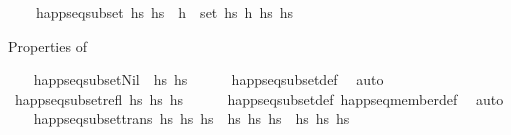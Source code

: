 \begin{isabellebody}
\ \ \ \ {\isachardoublequoteopen}happ{\isacharunderscore}{\kern0pt}seq{\isacharunderscore}{\kern0pt}subset\ hs\ hs\ {\isasymlongleftrightarrow}\ {\isacharparenleft}{\kern0pt}{\isasymforall}h\ {\isasymin}\ set\ hs\ h\ {\isasymin}\isactrlsub h\isactrlsub s\ hs%
\begin{isamarkuptext}%
Properties of %
\end{isamarkuptext}\isamarkuptrue%
\ \ \isamarkupfalse%
\ happ{\isacharunderscore}{\kern0pt}seq{\isacharunderscore}{\kern0pt}subset{\isacharunderscore}{\kern0pt}Nil{\isacharcolon}{\kern0pt}\ {\isachardoublequoteopen}{\isacharbrackleft}{\kern0pt}{\isacharbrackright}{\kern0pt}\ {\isasymsubseteq}\isactrlsub h\isactrlsub s\ hs{\isachardoublequoteclose}\isanewline
%
\isadelimproof
\ \ \ \ %
\endisadelimproof
%
\isatagproof
{}\isamarkupfalse%
\ happ{\isacharunderscore}{\kern0pt}seq{\isacharunderscore}{\kern0pt}subset{\isacharunderscore}{\kern0pt}def\ \isamarkupfalse%
\ auto%
\endisatagproof
{\isafoldproof}%
%
\isadelimproof
\isanewline
%
\endisadelimproof
\isanewline
\ \ \isamarkupfalse%
\ happ{\isacharunderscore}{\kern0pt}seq{\isacharunderscore}{\kern0pt}subset{\isacharunderscore}{\kern0pt}refl{\isacharcolon}{\kern0pt}\ {\isachardoublequoteopen}hs\ {\isasymsubseteq}\isactrlsub h\isactrlsub s\ hs{\isachardoublequoteclose}\isanewline
%
\isadelimproof
\ \ \ \ %
\endisadelimproof
%
\isatagproof
{}\isamarkupfalse%
\ happ{\isacharunderscore}{\kern0pt}seq{\isacharunderscore}{\kern0pt}subset{\isacharunderscore}{\kern0pt}def\ happ{\isacharunderscore}{\kern0pt}seq{\isacharunderscore}{\kern0pt}member{\isacharunderscore}{\kern0pt}def\ \isamarkupfalse%
\ auto%
\endisatagproof
{\isafoldproof}%
%
\isadelimproof
\isanewline
%
\endisadelimproof
\isanewline
\ \ \isamarkupfalse%
\ happ{\isacharunderscore}{\kern0pt}seq{\isacharunderscore}{\kern0pt}subset{\isacharunderscore}{\kern0pt}trans{\isacharcolon}{\kern0pt}\ {\isachardoublequoteopen}hs\ {\isasymsubseteq}\isactrlsub h\isactrlsub s\ hs\ {\isasymand}\ hs\ {\isasymsubseteq}\isactrlsub h\isactrlsub s\ hs\ {\isasymLongrightarrow}\ hs\ {\isasymsubseteq}\isactrlsub h\isactrlsub s\ hs\isanewline

\end{isabellebody}
